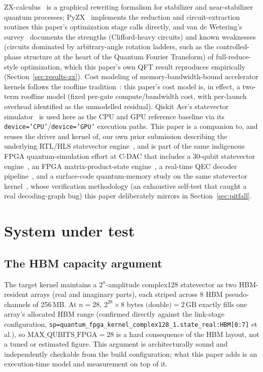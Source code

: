 \documentclass[pdflatex,sn-mathphys,Numbered]{sn-jnl}
\begin{document}
ZX-calculus~\cite{coecke2011} is a graphical rewriting formalism for stabilizer and near-stabilizer quantum processes; PyZX~\cite{kissinger2020} implements the reduction and circuit-extraction routines this paper's optimization stage calls directly, and van de Wetering's survey~\cite{vandewetering2020} documents the strengths (Clifford-heavy circuits) and known weaknesses (circuits dominated by arbitrary-angle rotation ladders, such as the controlled-phase structure at the heart of the Quantum Fourier Transform) of full-reduce-style optimization, which this paper's own QFT result reproduces empirically (Section~\ref{sec:results-zx}). Cost modeling of memory-bandwidth-bound accelerator kernels follows the roofline tradition~\cite{williams2009}: this paper's cost model is, in effect, a two-term roofline model (fixed per-gate compute/bandwidth cost, with per-launch overhead identified as the unmodelled residual). Qiskit Aer's statevector simulator~\cite{qiskit} is used here as the CPU and GPU reference baseline via its \texttt{device='CPU'}/\texttt{device='GPU'} execution paths. This paper is a companion to, and reuses the driver and kernel of, our own prior submission describing the underlying RTL/HLS statevector engine~\cite{ali_rtl_statevector}, and is part of the same indigenous FPGA quantum-simulation effort at C-DAC that includes a 30-qubit statevector engine~\cite{ali_30qubit_sim}, an FPGA matrix-product-state engine~\cite{ali_mps_engine}, a real-time QEC decoder pipeline~\cite{ali_shor_steane_qec}, and a surface-code quantum-memory study on the same statevector kernel~\cite{ali_surface_code}, whose verification methodology (an exhaustive self-test that caught a real decoding-graph bug) this paper deliberately mirrors in Section~\ref{sec:pitfall}.

\section{System under test}\label{sec:system}

\subsection{The HBM capacity argument}\label{sec:hbm-argument}

The target kernel maintains a $2^{n}$-amplitude complex128 statevector as two HBM-resident arrays (real and imaginary parts), each striped across 8 HBM pseudo-channels of 256\,MB. At $n=28$, $2^{28}\times 8\text{ bytes (double)}=2\,\text{GB}$ exactly fills one array's allocated HBM range (confirmed directly against the link-stage configuration, \texttt{sp=quantum\_fpga\_kernel\_complex128\_1.state\_real:HBM[0:7]} et al.), so $\text{MAX\_QUBITS\_FPGA}=28$ is a hard consequence of the HBM layout, not a tuned or estimated figure. This argument is architecturally sound and independently checkable from the build configuration; what this paper adds is an execution-time model and measurement on top of it.
\end{document}
